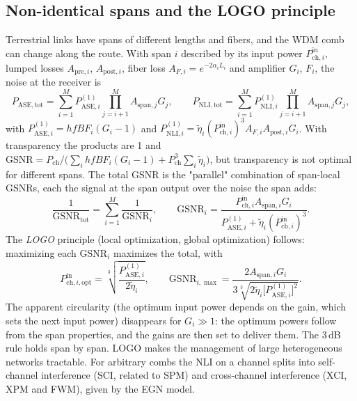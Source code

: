 \subsection{Non-identical spans and the LOGO principle}
Terrestrial links have spans of different lengths and fibers, and the WDM comb can change along the
route. With span $i$ described by its input power $P^{\mathrm{in}}_{\mathrm{ch},i}$, lumped losses $A_{\mathrm{pre},i}$, $A_{\mathrm{post},i}$,
fiber loss $A_{F,i}=e^{-2\alpha_iL_i}$ and amplifier $G_i$, $F_i$, the noise at the receiver is
\begin{equation}
  P_{\mathrm{ASE,tot}}=\sum_{i=1}^MP^{(1)}_{\mathrm{ASE},i}\prod_{j=i+1}^MA_{\mathrm{span},j}G_j,\qquad
  P_{\mathrm{NLI,tot}}=\sum_{i=1}^MP^{(1)}_{\mathrm{NLI},i}\prod_{j=i+1}^MA_{\mathrm{span},j}G_j,
\end{equation}
with $P^{(1)}_{\mathrm{ASE},i}=hfBF_i(G_i-1)$ and $P^{(1)}_{\mathrm{NLI},i}=\tilde\eta_i(P^{\mathrm{in}}_{\mathrm{ch},i})^3A_{F,i}A_{\mathrm{post},i}G_i$. With transparency the
products are 1 and $\mathrm{GSNR}=P_{\mathrm{ch}}/\big(\sum_ihfBF_i(G_i-1)+P_{\mathrm{ch}}^3\sum_i\tilde\eta_i\big)$, but transparency is not
optimal for different spans. The total GSNR is the "parallel" combination of span-local GSNRs, each the
signal at the span output over the noise the span adds:
\begin{equation}
  \frac1{\mathrm{GSNR}_{\mathrm{tot}}}=\sum_{i=1}^M\frac1{\mathrm{GSNR}_i},\qquad
  \mathrm{GSNR}_i=\frac{P^{\mathrm{in}}_{\mathrm{ch},i}A_{\mathrm{span},i}G_i}{P^{(1)}_{\mathrm{ASE},i}+\tilde\eta_i(P^{\mathrm{in}}_{\mathrm{ch},i})^3} .
\end{equation}
The \emph{LOGO} principle (local optimization, global optimization) follows: maximizing each $\mathrm{GSNR}_i$
maximizes the total, with
\begin{equation}
  P^{\mathrm{in}}_{\mathrm{ch},i,\mathrm{opt}}=\sqrt[3]{\frac{P^{(1)}_{\mathrm{ASE},i}}{2\tilde\eta_i}},\qquad
  \mathrm{GSNR}_{i,\max}=\frac{2A_{\mathrm{span},i}G_i}{3\sqrt[3]{2\tilde\eta_i\big[P^{(1)}_{\mathrm{ASE},i}\big]^2}} .
\end{equation}
The apparent circularity (the optimum
input power depends on the gain, which sets the next input power) disappears for $G_i\gg1$: the
optimum powers follow from the span properties, and the gains are then set to deliver them. The
3\,dB rule holds span by span. LOGO makes the management of large heterogeneous networks tractable.
For arbitrary combs the NLI on a channel splits into self-channel interference (SCI, related to SPM)
and cross-channel interference (XCI, XPM and FWM), given by the EGN model.

